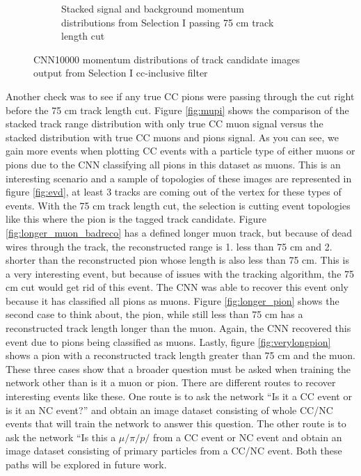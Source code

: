\begin{figure}[htp!]
\begin{subfigure}[t]{.45\textwidth}
	\caption{Stacked signal and background momentum distributions from Selection I passing 75 cm track length cut}
	\label{fig:sel1mod_momentum_stackedoriginal}
	\end{subfigure}
	\quad
\caption{CNN10000 momentum distributions of track candidate images output from Selection I cc-inclusive filter}
\label{fig:sel1mod_parP}
\end{figure}

Another check was to see if any true CC pions were passing through the cut right before the 75 cm track length cut. Figure \ref{fig:mupi} shows the comparison of the stacked track range distribution with only true CC muon signal versus the stacked distribution with true CC muons and pions signal. As you can see, we gain more events when plotting CC events with a particle type of either muons or pions due to the CNN classifying all pions in this dataset as muons. This is an interesting scenario and a sample of topologies of these images are represented in figure \ref{fig:evd}, at least 3 tracks are coming out of the vertex for these types of events. With the 75 cm track length cut, the selection is cutting event topologies like this where the pion is the tagged track candidate. Figure \ref{fig:longer_muon_badreco} has a defined longer muon track, but because of dead wires through the track, the reconstructed range is 1. less than 75 cm and 2. shorter than the reconstructed pion whose length is also less than 75 cm. This is a very interesting event, but because of issues with the tracking algorithm, the 75 cm cut would get rid of this event. The CNN was able to recover this event only because it has classified all pions as muons. Figure \ref{fig:longer_pion} shows the second case to think about, the pion, while still less than 75 cm has a reconstructed track length longer than the muon. Again, the CNN recovered this event due to pions being classified as muons. Lastly, figure \ref{fig:verylongpion} shows a pion with a reconstructed track length greater than 75 cm and the muon. These three cases show that a broader question must be asked when training the network other than is it a muon or pion. There are different routes to recover interesting events like these. One route is to ask the network ``Is it a CC event or is it an NC event?'' and obtain an image dataset consisting of whole CC/NC events that will train the network to answer this question. The other route is to ask the network ``Is this a $\mu/\pi/p/$ from a CC event or NC event and obtain an image dataset consisting of primary particles from a CC/NC event. Both these paths will be explored in future work.     

